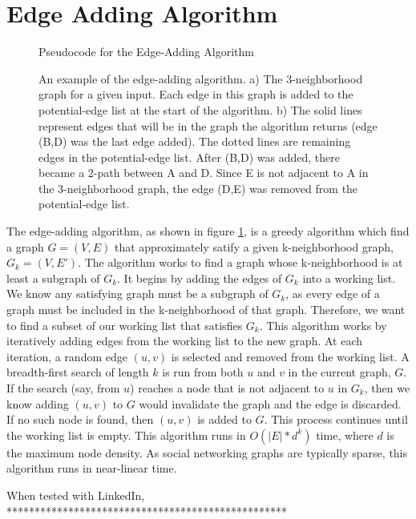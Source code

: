 \section{Edge Adding Algorithm}


\begin{figure}[htb]
	\begin{algorithmic}
		\renewcommand{\algorithmicrequire}{\textbf{Input:}}
		\renewcommand{\algorithmicensure}{\textbf{Output:}}
			\EndIf
			\EndIf
		\EndWhile
	\end{algorithmic}
	\caption{Pseudocode for the Edge-Adding Algorithm}
	\caption{An example of the edge-adding algorithm. a) The 3-neighborhood graph for a given input. Each edge in this graph is added to the potential-edge list at the start of the algorithm. b) The solid lines represent edges that will be in the graph the algorithm returns (edge (B,D) was the last edge added). The dotted lines are remaining edges in the potential-edge list. After (B,D) was added, there became a 2-path between A and D. Since E is not adjacent to A in the 3-neighborhood graph, the edge (D,E) was removed from the potential-edge list.}
	\label{fig:edge-adding}
\end{figure}


\indent The edge-adding algorithm, as shown in figure \ref{fig:edge-adding}, is a greedy algorithm which find a graph $G = (V,E)$ that approximately satify a given k-neighborhood graph, $G_k = (V, E')$. The algorithm works to find a graph whose k-neighborhood is at least a subgraph of $G_k$. It begins by adding the edges of $G_k$ into a working list. We know any satisfying graph must be a subgraph of $G_k$, as every edge of a graph must be included in the k-neighborhood of that graph. Therefore, we want to find a subset of our working list that satisfies $G_k$. This algorithm works by iteratively adding edges from the working list to the new graph.  At each iteration, a random edge $(u,v)$ is selected and removed from the working list. A breadth-first search of length $k$ is run from both $u$ and $v$ in the current graph, $G$. If the search (say, from $u$) reaches a node that is not adjacent to $u$ in $G_k$, then we know adding $(u,v)$ to $G$ would invalidate the graph and the edge is discarded. If no such node is found, then $(u,v)$ is added to $G$. This process continues until the working list is empty. This algorithm runs in $O(|E|*d^k)$ time, where $d$ is the maximum node density. As social networking graphs are typically sparse, this algorithm runs in near-linear time.

\indent When tested with LinkedIn, **************************************************

